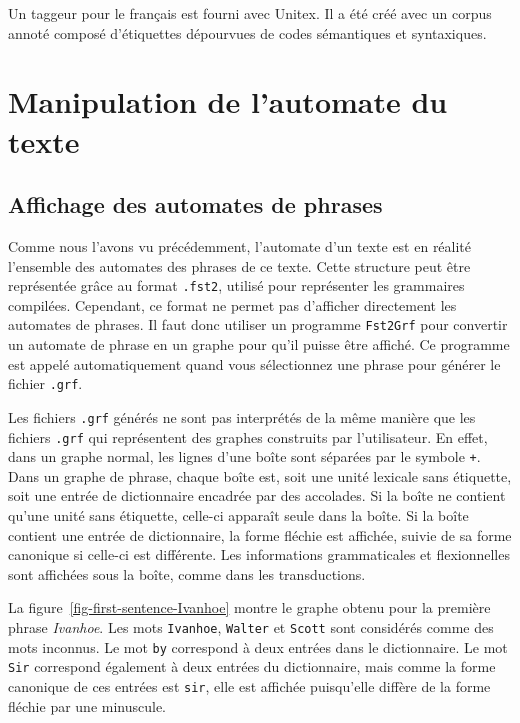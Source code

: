 \bigskip
\noindent Un taggeur pour le français est fourni avec Unitex. Il a été créé avec un corpus annoté 
composé d'étiquettes dépourvues de codes sémantiques et syntaxiques.



\section{Manipulation de l’automate du texte}

\subsection{Affichage des automates de phrases}
\label{section-displaying-sentence-automata}
Comme nous l’avons vu précédemment, l’automate d’un texte est en réalité l’ensemble
des automates des phrases de ce texte. Cette structure peut être représentée grâce au format
\verb+.fst2+, utilisé pour représenter les grammaires compilées. 
Cependant, ce format ne permet pas d’afficher directement les automates de phrases. Il
faut donc utiliser un programme \verb+Fst2Grf+ pour convertir un automate de phrase en un graphe pour qu’il 
puisse être affiché. Ce programme est appelé automatiquement quand
vous sélectionnez une phrase pour générer le fichier \verb+.grf+.

\bigskip
\noindent Les fichiers \verb+.grf+ générés ne sont pas interprétés de la même manière
que les fichiers \verb+.grf+ qui représentent des graphes construits par l’utilisateur. 
En effet, dans un graphe normal, les lignes d’une boîte sont séparées par le symbole \verb$+$.
Dans un graphe de phrase, chaque boîte est, soit une unité lexicale sans étiquette, soit une 
entrée de dictionnaire encadrée par des accolades. Si la boîte ne contient qu’une unité sans 
étiquette, celle-ci apparaît seule dans la boîte. Si la boîte contient une entrée de dictionnaire, 
la forme fléchie est affichée, suivie de sa forme canonique si celle-ci est différente. 
Les informations grammaticales et flexionnelles sont affichées sous la boîte, comme dans les transductions.



\bigskip
\noindent La figure~\ref{fig-first-sentence-Ivanhoe} montre le graphe obtenu pour 
la première phrase \textit{Ivanhoe}. Les mots \verb+Ivanhoe+,
\verb+Walter+ et \verb+Scott+ sont considérés comme des mots inconnus. Le mot \verb+by+
correspond à deux entrées dans le dictionnaire. Le mot \verb+Sir+ correspond également à 
deux entrées du dictionnaire, mais comme la forme canonique de ces entrées est
\verb+sir+, elle est affichée puisqu’elle diffère de la forme fléchie par une minuscule.


